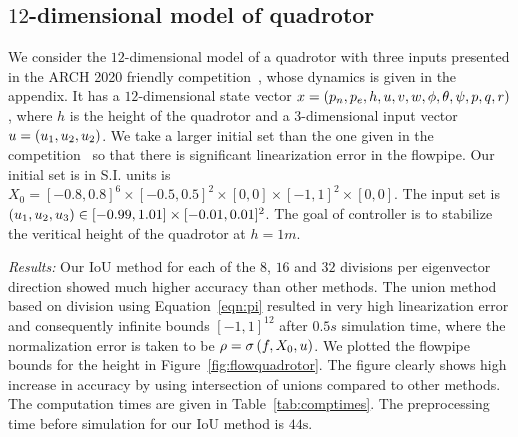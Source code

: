 \subsection{$12$-dimensional model of quadrotor}
We consider the $12$-dimensional model of a quadrotor with three
inputs presented in the ARCH 2020 friendly
competition~\cite{geretti2020arch}, whose dynamics is given in the
appendix.  It has a $12$-dimensional state vector $x
= \left(p_n,p_e,h,u,v,w,\phi,\theta,\psi,p,q,r\right)$, where $h$ is the
height of the quadrotor and a $3$-dimensional input vector $u
= \left(u_1,u_2,u_2\right)$.  We take a larger initial set than the one given
in the competition~\cite{geretti2020arch} so that there is significant
linearization error in the flowpipe.  Our initial set is in S.I. units
is $X_0 = [-0.8,0.8]^6\times[-0.5,0.5]^2\times[0,0]\times
[-1,1]^2\times[0,0]$.  The input set is $\left(u_1,u_2,u_3\right)\in
[-0.99,1.01]\times[-0.01,0.01]^2$.  The goal of controller is to
stabilize the veritical height of the quadrotor at $h = 1m$.

  

\emph{Results:}  Our IoU method for each of the $8$, $16$ and $32$ divisions per
  eigenvector direction showed much higher accuracy than other
  methods.  The union method based on division using
  Equation~\ref{eqn:pi} resulted in very high linearization error and
  consequently infinite bounds $[-1,1]^{12}$ after $0.5 s$ simulation
  time, where the normalization error is taken to be $\rho
  = \sigma\left(f,X_0,u\right)$.  We plotted the flowpipe bounds for the
  height in Figure~\ref{fig:flowquadrotor}.  The figure clearly shows
  high increase in accuracy by using intersection of unions compared
  to other methods.  The computation times are given in
  Table~\ref{tab:comptimes}.  The preprocessing time before simulation
  for our IoU method is $44\si{\second}$.
%
